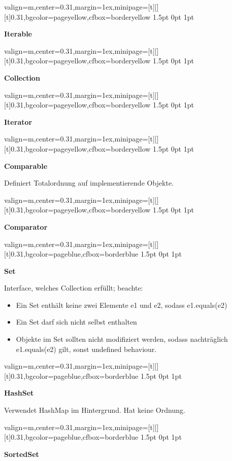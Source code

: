 \documentclass[11pt, a4paper, landscape]{article}
\newcommand{\fancyheader}[1]{
	\centerline{\sffamily \textbf{ \large #1}}
}
\newenvironment{fancybox}[2]
{
	\begin{adjustbox}{valign=m,center=0.31\textwidth,margin=1ex,minipage=[t][][t]{0.31\textwidth},bgcolor=#1,cfbox=#2 1.5pt 0pt 1pt}
	\begin{centering}
}
{
	\end{centering}
	\end{adjustbox}
}
\begin{document}

\begin{multicols}{3}
\raggedcolumns

\begin{fancybox}{pageyellow}{borderyellow}
\fancyheader{Iterable}

\end{fancybox}

\begin{fancybox}{pageyellow}{borderyellow}
\fancyheader{Collection}

\end{fancybox}

\begin{fancybox}{pageyellow}{borderyellow}
\fancyheader{Iterator}

\end{fancybox}

\begin{fancybox}{pageyellow}{borderyellow}
\fancyheader{Comparable}
\raggedright{
Definiert Totalordnung auf implementierende Objekte.
}

\end{fancybox}

\begin{fancybox}{pageyellow}{borderyellow}
\fancyheader{Comparator}

\end{fancybox}

\begin{fancybox}{pageblue}{borderblue}
\fancyheader{Set}


Interface, welches Collection erfüllt; beachte:
\begin{itemize}
\item Ein Set enthält keine zwei Elemente e1 und e2, sodass e1.equals(e2)
\item Ein Set darf sich nicht selbst enthalten
\item Objekte im Set sollten nicht modifiziert werden, sodass nachträglich e1.equals(e2) gilt, sonst undefined behaviour.
\end{itemize}
\end{fancybox}

\begin{fancybox}{pageblue}{borderblue}
\fancyheader{HashSet}

\raggedright{
	Verwendet HashMap im Hintergrund. Hat keine Ordnung.
}
\end{fancybox}

\begin{fancybox}{pageblue}{borderblue}
\fancyheader{SortedSet}



\end{fancybox}
\end{multicols}
\end{document}
